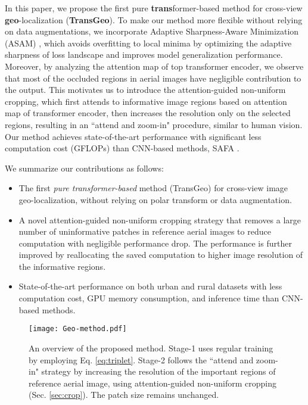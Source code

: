 \documentclass[10pt,twocolumn,letterpaper]{article}
\begin{document}
In this paper, 
we propose {the first pure \textbf{trans}former-based method} for cross-view \textbf{geo}-localization (\textbf{TransGeo}).
To make our method more flexible without relying on data augmentations, we incorporate  Adaptive Sharpness-Aware Minimization (ASAM) \cite{ASAM}, which avoids overfitting to local minima by optimizing the adaptive sharpness of loss landscape and improves model generalization performance. 
Moreover, by analyzing  the attention map of top transformer encoder, we observe that most of the occluded regions in aerial images have negligible contribution to the output. 
This motivates us to introduce the attention-guided non-uniform cropping, which first attends to informative image regions based on attention map of transformer encoder, then increases the resolution only on the selected regions, resulting in an ``attend and zoom-in" procedure, similar to human vision. Our method achieves state-of-the-art performance with significant less computation cost (GFLOPs) than CNN-based methods, \eg SAFA \cite{SAFA}. 

We summarize our contributions as follows:
\begin{itemize}[noitemsep,leftmargin=*]
    \item The first \textit{pure transformer-based} method (TransGeo) for cross-view image geo-localization, without relying on polar transform or data augmentation.\item A novel attention-guided non-uniform cropping strategy that removes a large number of uninformative patches in reference aerial images to reduce computation with negligible performance drop. The performance is further improved by reallocating the saved computation to higher image resolution of the informative regions. \item State-of-the-art performance on both urban and rural datasets with less computation cost, GPU memory consumption, and inference time than CNN-based methods. \end{itemize}

\begin{figure*}[!htbp]
    \centering
\texttt{[image: Geo-method.pdf]}
    \vspace{-0.2cm}
    \caption{An overview of the proposed method. Stage-1 uses regular training by employing Eq. \ref{eq:triplet}. Stage-2 follows the ``attend and zoom-in" strategy by increasing the resolution of   the important regions of reference aerial image, using attention-guided non-uniform cropping (Sec. \ref{sec:crop}). The patch size remains unchanged.}
\label{fig:method}
\end{figure*}
\end{document}
